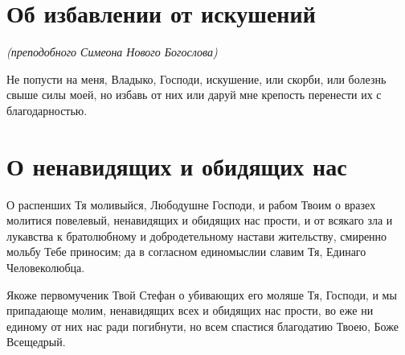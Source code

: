 

\label{_content_molitvi-vskorbyah}

 


 

\section{Об избавлении от искушений}\begin{mymulticols}
 

\itshape (преподобного Симеона Нового Богослова)

\normalfont{}Не попусти на меня, Владыко, Господи, искушение, или скорби, или болезнь свыше силы моей, но избавь от них или даруй мне крепость перенести их с благодарностью.

\end{mymulticols}

\section{О ненавидящих и обидящих нас}\begin{mymulticols}
 


О распенших Тя моливыйся, Любодушне Господи, и рабом Твоим о вразех молитися повелевый, ненавидящих и обидящих нас прости, и от всякаго зла и лукавства к братолюбному и добродетельному настави жительству, смиренно мольбу Тебе приносим; да в согласном единомыслии славим Тя, Единаго Человеколюбца.


Якоже первомученик Твой Стефан о убивающих его моляше Тя, Господи, и мы припадающе молим, ненавидящих всех и обидящих нас прости, во еже ни единому от них нас ради погибнути, но всем спастися благодатию Твоею, Боже Всещедрый.

\end{mymulticols}

